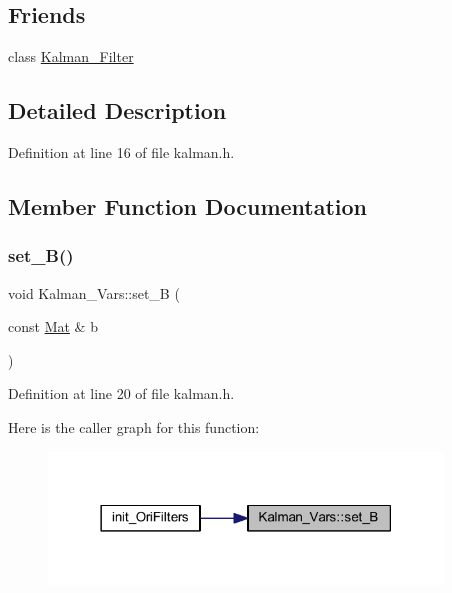 \subsection*{Friends}
\begin{DoxyCompactItemize}
\item 
class \mbox{\hyperlink{struct_kalman___vars_a2a9de2e5af58a1f7f78798d6952f7c66}{Kalman\+\_\+\+Filter}}
\end{DoxyCompactItemize}


\subsection{Detailed Description}


Definition at line 16 of file kalman.\+h.



\subsection{Member Function Documentation}
\mbox{\label{struct_kalman___vars_a7e2b8d6cf9ecb4b3ac722eed4a5a8c5a}} 
\subsubsection{\texorpdfstring{set\_B()}{set\_B()}}
{\footnotesize\ttfamily void Kalman\+\_\+\+Vars\+::set\+\_\+B (\begin{DoxyParamCaption}\item[{const \mbox{\hyperlink{class_mat}{Mat}} \&}]{b }\end{DoxyParamCaption})\hspace{0.3cm}{\ttfamily [inline]}}



Definition at line 20 of file kalman.\+h.

Here is the caller graph for this function\+:
\nopagebreak
\begin{figure}[H]
\begin{center}
\leavevmode
\includegraphics[width=297pt]{struct_kalman___vars_a7e2b8d6cf9ecb4b3ac722eed4a5a8c5a_icgraph}
\end{center}
\end{figure}
\mbox{\label{struct_kalman___vars_aaa0914f751fcdac78284162f6c8c2a74}} 
